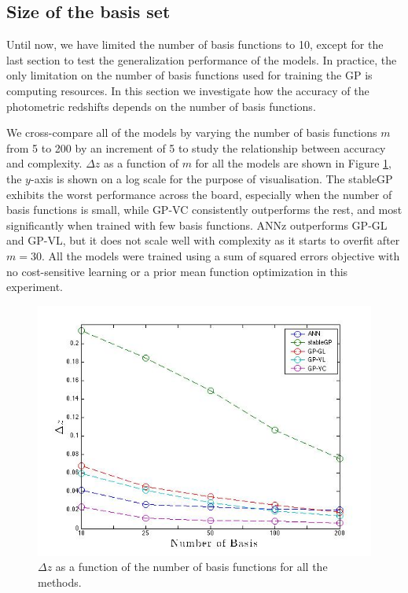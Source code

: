 \documentclass[useAMS,usenatbib,fleqn]{mn2e}
\begin{document}
\subsection{Size of the basis set}

Until now, we have limited the number of basis functions to 10, except for the last section to test the generalization performance of the models. In practice, the only limitation on the number of basis functions used for training the GP is computing resources. In this section we investigate how the accuracy of the photometric redshifts depends on the number of basis functions.

We cross-compare all of the models by varying the number of basis functions $m$ from 5 to 200 by an increment of 5 to study the relationship between accuracy and complexity. $\Delta z$ as a function of $m$ for all the models are shown in Figure \ref{fig-rmses}, the $y$-axis is shown on a log scale for the purpose of visualisation. The {\sc stableGP} exhibits the worst performance across the board, especially when the number of basis functions is small, while GP-VC consistently outperforms the rest, and most significantly when trained with few basis functions. {\sc ANNz} outperforms GP-GL and GP-VL, but it does not scale well with complexity as it starts to overfit after $m=30$. All the models were trained using a sum of squared errors objective with no cost-sensitive learning or a prior mean function optimization in this experiment. 

\begin{figure}
	\centering
	\includegraphics[width=\columnwidth]{figures/different-basis}
	\caption{$\Delta z$ as a function of the number of basis functions for all the methods.}
	\label{fig-rmses}
\end{figure}
\end{document}
